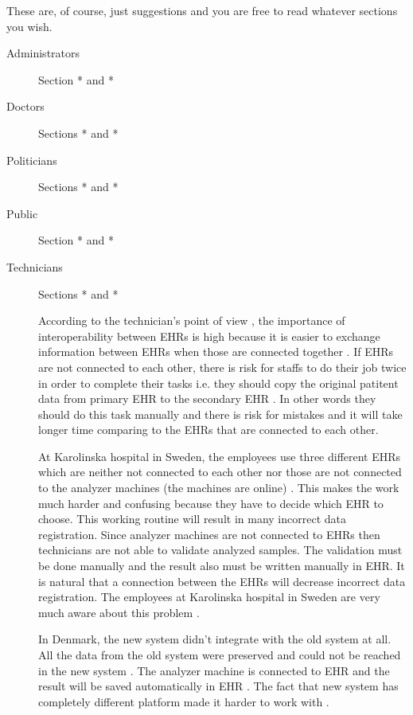 \documentclass[14pt]{article}
\begin{document}
These are, of course, just suggestions and you are free to read whatever sections you wish.

\begin{description}
\item[Administrators] Section * and *
\item[Doctors] Sections * and *
\item[Politicians] Sections * and *
\item[Public] Section * and *
\item[Technicians] Sections * and *

According to the technician's point of view \cite{FarzinYazdi}, the importance of interoperability between \glspl{EHR} is high because it is easier to exchange information between \glspl{EHR} when those are connected together \cite{FarzinYazdi}. If \glspl{EHR} are not connected to each other, there is risk for staffs to do their job twice in order to complete their tasks i.e. they should copy the original patitent data from primary \gls{EHR} to the secondary \gls{EHR} \cite{FarzinYazdi}. In other words they should do this task manually and there is risk for mistakes and it will take longer time comparing to the \glspl{EHR} that are connected to each other.

At Karolinska hospital in Sweden, the employees use three different \glspl{EHR} which are neither not connected to each other nor those are not connected to the analyzer machines (the machines are online) \cite{FarzinYazdi}. This makes the work much harder and confusing because they have to decide which \gls{EHR} to choose. This working routine will result in many incorrect data registration. Since analyzer machines are not connected to \glspl{EHR} then technicians are not able to validate analyzed samples. The validation must be done manually and the result also must be written manually in \gls{EHR}\cite{FarzinYazdi}.  It is natural that a connection between the \glspl{EHR} will decrease incorrect data registration. The employees at Karolinska hospital in Sweden are very much aware about this problem \cite{FarzinYazdi}.

In Denmark, the new system didn't integrate with the old system at all. All the data from the old system were preserved and could not be reached in the new system \cite{FarzinYazdi}. The analyzer machine is connected to \gls{EHR} and the result will be saved automatically in \gls{EHR} \cite{FarzinYazdi}. The fact that new system has completely different platform made it harder to work with \cite{FarzinYazdi}.


\end{description}
\end{document}
